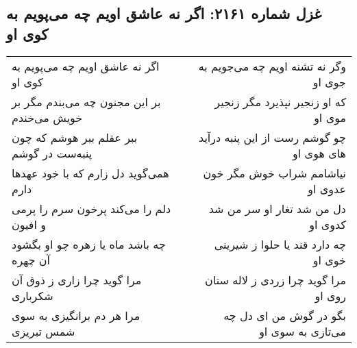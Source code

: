 \begin{center}
\section*{غزل شماره ۲۱۶۱: اگر نه عاشق اویم چه می‌پویم به کوی او}
\label{sec:2161}
\begin{longtable}{l p{0.5cm} r}
اگر نه عاشق اویم چه می‌پویم به کوی او
&&
وگر نه تشنه اویم چه می‌جویم به جوی او
\\
بر این مجنون چه می‌بندم مگر بر خویش می‌خندم
&&
که او زنجیر نپذیرد مگر زنجیر موی او
\\
ببر عقلم ببر هوشم که چون پنبه‌ست در گوشم
&&
چو گوشم رست از این پنبه درآید های هوی او
\\
همی‌گوید دل زارم که با خود عهدها دارم
&&
نیاشامم شراب خوش مگر خون عدوی او
\\
دلم را می‌کند پرخون سرم را پرمی و افیون
&&
دل من شد تغار او سر من شد کدوی او
\\
چه باشد ماه یا زهره چو او بگشود آن چهره
&&
چه دارد قند یا حلوا ز شیرینی خوی او
\\
مرا گوید چرا زاری ز ذوق آن شکرباری
&&
مرا گوید چرا زردی ز لاله ستان روی او
\\
مرا هر دم برانگیزی به سوی شمس تبریزی
&&
بگو در گوش من ای دل چه می‌تازی به سوی او
\\
\end{longtable}
\end{center}
